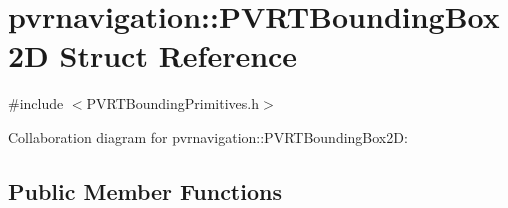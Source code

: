 \hypertarget{structpvrnavigation_1_1_p_v_r_t_bounding_box2_d}{\section{pvrnavigation\+:\+:P\+V\+R\+T\+Bounding\+Box2\+D Struct Reference}
\label{structpvrnavigation_1_1_p_v_r_t_bounding_box2_d}
}


{\ttfamily \#include $<$P\+V\+R\+T\+Bounding\+Primitives.\+h$>$}



Collaboration diagram for pvrnavigation\+:\+:P\+V\+R\+T\+Bounding\+Box2\+D\+:
\subsection*{Public Member Functions}
